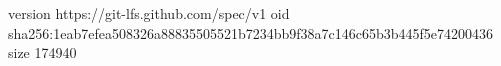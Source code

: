 version https://git-lfs.github.com/spec/v1
oid sha256:1eab7efea508326a88835505521b7234bb9f38a7c146c65b3b445f5e74200436
size 174940
